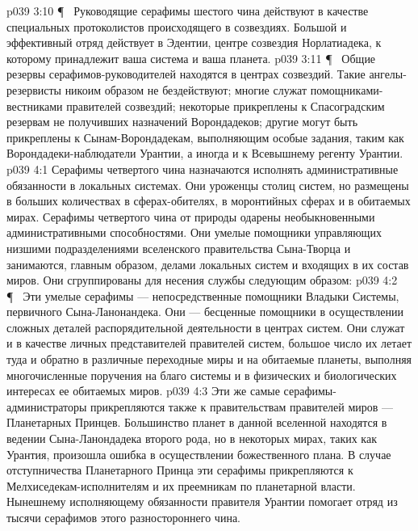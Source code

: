 \vs p039 3:10 \P\ \bibnobreakspace {} Руководящие серафимы шестого чина действуют в качестве специальных протоколистов происходящего в созвездиях. Большой и эффективный отряд действует в Эдентии, центре созвездия Норлатиадека, к которому принадлежит ваша система и ваша планета.
\vs p039 3:11 \P\ \bibnobreakspace {} Общие резервы серафимов\hyp{}руководителей находятся в центрах созвездий. Такие ангелы\hyp{}резервисты никоим образом не бездействуют; многие служат помощниками\hyp{}вестниками правителей созвездий; некоторые прикреплены к Спасоградским резервам не получивших назначений Ворондадеков; другие могут быть прикреплены к Сынам\hyp{}Ворондадекам, выполняющим особые задания, таким как Ворондадеки\hyp{}наблюдатели Урантии, а иногда и к Всевышнему регенту Урантии.
\vs p039 4:1 Серафимы четвертого чина назначаются исполнять административные обязанности в локальных системах. Они уроженцы столиц систем, но размещены в больших количествах в сферах\hyp{}обителях, в моронтийных сферах и в обитаемых мирах. Серафимы четвертого чина от природы одарены необыкновенными административными способностями. Они умелые помощники управляющих низшими подразделениями вселенского правительства Сына\hyp{}Творца и занимаются, главным образом, делами локальных систем и входящих в их состав миров. Они сгруппированы для несения службы следующим образом:
\vs p039 4:2 \P\ \bibnobreakspace {} Эти умелые серафимы --- непосредственные помощники Владыки Системы, первичного Сына\hyp{}Ланонандека. Они --- бесценные помощники в осуществлении сложных деталей распорядительной деятельности в центрах систем. Они служат и в качестве личных представителей правителей систем, большое число их летает туда и обратно в различные переходные миры и на обитаемые планеты, выполняя многочисленные поручения на благо системы и в физических и биологических интересах ее обитаемых миров.
\vs p039 4:3 Эти же самые серафимы\hyp{}администраторы прикрепляются также к правительствам правителей миров --- Планетарных Принцев. Большинство планет в данной вселенной находятся в ведении Сына\hyp{}Ланондадека второго рода, но в некоторых мирах, таких как Урантия, произошла ошибка в осуществлении божественного плана. В случае отступничества Планетарного Принца эти серафимы прикрепляются к Мелхиседекам\hyp{}исполнителям и их преемникам по планетарной власти. Нынешнему исполняющему обязанности правителя Урантии помогает отряд из тысячи серафимов этого разностороннего чина.
